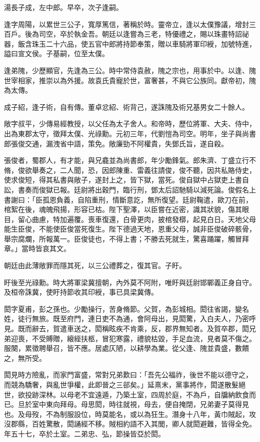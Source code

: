 \begin{pinyinscope}
湯長子成，左中郎。早卒，次子逢嗣。

逢字周陽，以累世三公子，寬厚篤信，著稱於時。靈帝立，逢以太僕豫議，增封三百戶。後為司空，卒於執金吾。朝廷以逢嘗為三老，特優禮之，賜以珠畫特詔祕器，飯含珠玉二十六品，使五官中郎將持節奉策，贈以車騎將軍印綬，加號特進，謚曰宣文侯。子基嗣，位至太僕。

逢弟隗，少歷顯官，先逢為三公。時中常侍袁赦，隗之宗也，用事於中。以逢、隗世宰相家，推崇以為外援。故袁氏貴寵於世，富奢甚，不與它公族同。獻帝初，隗為太傳。

成子紹，逢子術，自有傳。董卓忿紹、術背己，遂誅隗及術兄基男女二十餘人。

敞字叔平，少傳易經教授，以父任為太子舍人。和帝時，歷位將軍、大夫、侍中，出為東郡太守，徵拜太僕、光祿勳。元初三年，代劉愷為司空。明年，坐子與尚書郎張俊交通，漏洩省中語，策免。敞廉勁不阿權貴，失鄧氏旨，遂自殺。

張俊者，蜀郡人，有才能，與兄龕並為尚書郎，年少勵鋒氣。郎朱濟、丁盛立行不脩，俊欲舉奏之，二人聞，恐，因郎陳重、雷義往請俊，俊不聽，因共私賂侍史，使求俊短，得其私書與敞子，遂封上之，皆下獄，當死。俊自獄中占獄吏上書自訟，書奏而俊獄已報。廷尉將出穀門，臨行刑，鄧太后詔馳騎以減死論。俊假名上書謝曰：「臣孤恩負義，自陷重刑，情斷意訖，無所復望。廷尉鞠遣，歐刀在前，棺絮在後，魂魄飛揚，形容已枯。陛下聖澤，以臣嘗在近密，識其狀貌，傷其眼目，留心曲慮，特加遍覆。喪車復還，白骨更肉，披棺發槨，起見白日。天地父母能生臣俊，不能使臣俊當死復生。陛下德過天地，恩重父母，誠非臣俊破碎骸骨，舉宗腐爛，所報萬一。臣俊徒也，不得上書；不勝去死就生，驚喜踊躍，觸冒拜章。」當時皆哀其文。

朝廷由此薄敞罪而隱其死，以三公禮葬之，復其官。子盱。

盱後至光祿勳。時大將軍梁冀擅朝，內外莫不阿附，唯盱與廷尉邯鄲義正身自守。及桓帝誅冀，使盱持節收其印綬，事已具梁冀傳。

閎字夏甫，彭之孫也。少勵操行，苦身脩節。父賀，為彭城相。閎往省謁，變名姓，徒行無旅。既至府門，連日吏不為通，會阿母出，見閎驚，入白夫人，乃密呼見。既而辭去，賀遣車送之，閎稱眩疾不肯乘，反，郡界無知者。及賀卒郡，閎兄弟迎喪，不受賻贈，縗絰扶柩，冒犯寒露，禮貌枯毀，手足血流，見者莫不傷之。服闋，累徵聘舉召，皆不應。居處仄陋，以耕學為業。從父逢、隗並貴盛，數饋之，無所受。

閎見時方險亂，而家門富盛，常對兄弟歎曰：「吾先公福祚，後世不能以德守之，而競為驕奢，與亂世爭權，此即晉之三郤矣。」延熹末，黨事將作，閎遂散髮絕世，欲投跡深林。以母老不宜遠遁，乃築土室，四周於庭，不為戶，自牖納飲食而已。旦於室中東向拜母。母思閎，時往就視，母去，便自掩閉，兄弟妻子莫得見也。及母歿，不為制服設位，時莫能名，或以為狂生。潛身十八年，黃巾賊起，攻沒郡縣，百姓驚散，閎誦經不移。賊相約語不入其閭，卿人就閎避難，皆得全免。年五十七，卒於土室。二弟忠、弘，節操皆亞於閎。


\end{pinyinscope}
